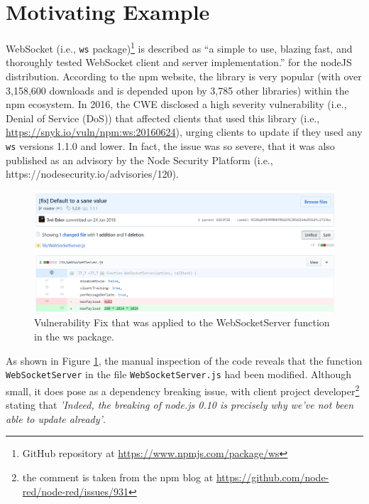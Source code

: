 \section{Motivating Example}

WebSocket (i.e., \texttt{ws} package)\footnote{GitHub repository at \url{https://www.npmjs.com/package/ws}} is described as ``a simple to use, blazing fast, and thoroughly tested WebSocket client and server implementation.'' for the nodeJS distribution.
According to the npm website, the library is very popular (with over 3,158,600 downloads and is  depended upon by 3,785 other libraries) within the npm ecosystem.
In 2016, the CWE disclosed a high severity vulnerability (i.e., Denial of Service (DoS)) that affected clients that used this library (i.e.,  \url{https://snyk.io/vuln/npm:ws:20160624}), urging clients to update if they used any \texttt{ws} versions 1.1.0 and lower.
In fact, the issue was so severe, that it was also published as an advisory by the Node Security Platform (i.e., https://nodesecurity.io/advisories/120).

\begin{figure}[th]
\centering
\includegraphics[width=1\textwidth]{images/codeWS.PNG}
\caption{Vulnerability Fix that was applied to the WebSocketServer function in the ws package.}
\label{fig:codeWS}
   \end{figure}

As shown in Figure \ref{fig:codeWS}, the manual inspection of the code reveals that the function \texttt{WebSocketServer} in the file \texttt{WebSocketServer.js} had been modified.
Although small, it does pose as a dependency breaking issue, with client project developer\footnote{the comment is taken from the npm blog at \url{https://github.com/node-red/node-red/issues/931}} stating that \textit{'Indeed, the breaking of node.js 0.10 is precisely why we've not been able to update already'}. 

